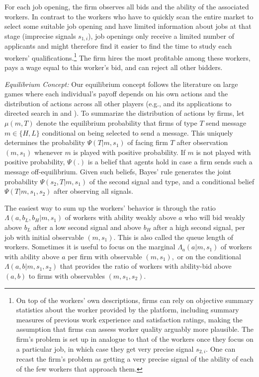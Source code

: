 \documentclass[12pt]{article}
\begin{document}
For each job opening, the firm observes all bids and the ability of the associated workers. In contrast to the workers who have to quickly scan the entire market to select some suitable job opening and have limited information about jobs at that stage (imprecise signals $s_{1,i}$), job openings only receive a limited number of applicants and might therefore find it easier to find the time to study each workers' qualifications.\footnote{On top of the workers' own descriptions, firms can rely on objective summary statistics about the worker provided by the platform, including summary measures of previous work experience and satisfaction ratings, making the assumption that firms can assess worker quality arguably more plausible. The firm's problem is set up in analogue to that of the workers once they focus on a particular job, in which case they get very precise signal $s_{2,i}$. One can recast the firm's problem as getting a very precise signal of the ability of each of the few workers that approach them.} The firm hires the most profitable among these workers, pays a wage equal to this worker's bid, and can reject all other bidders.

\textit{Equilibrium Concept:} Our equilibrium concept follows the literature on large games where each individual's payoff depends on his own actions and the distribution of actions across all other players (e.g., \cite{mas1984theorem} and its applications to directed search in \cite{eeckhout2010sorting} and \cite{peters2010noncontractible}). To summarize the distribution of actions by firms, let $\mu (m,T)$ denote the equilibrium probability
that firms of type $T$ send message $m\in \{H,L\}$ conditional on being
selected to send a message. This uniquely determines the probability $\Psi
(T|m,s_{1})$ of facing firm $T$ after observation $(m,s_{1})$ whenever $m$
is played with positive probability. If $m$ is not played with positive
probability, $\Psi (.)$ is a belief that agents hold in case a firm sends
such a message off-equilibrium. Given such beliefs, Bayes' rule generates
the joint probability $\Psi (s_{2},T|m,s_{1})$ of the second signal and
type, and a conditional belief $\Psi (T|m,s_{1},s_{2})$ after observing all
signals.

The easiest way to sum up the workers' behavior is through the ratio $\Lambda
(a,b_{L},b_{H}|m,s_{1})$ of workers with ability weakly above $a$ who will
bid weakly above $b_{L}$ after a low second signal and above $b_{H}$ after a
high second signal, per job with initial observable $(m,s_{1}).$ This is
also called the queue length of workers. Sometimes it is useful to focus on
the marginal $\Lambda _{a}(a|m,s_{1})$ of workers with ability above $a$ per
firm with observable $(m,s_{1}),$ or on the conditional $\Lambda
(a,b|m,s_{1},s_{2})$ that provides the ratio of workers with ability-bid
above $(a,b)$ to firms with observables $(m,s_{1},s_{2}).$
\end{document}
